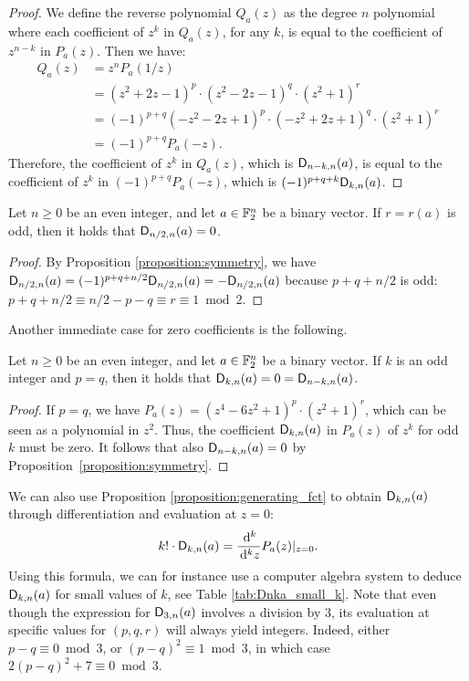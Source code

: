 \documentclass{llncs}
\begin{document}
\begin{proof}
	We define the reverse polynomial  $Q_a(z)$ as the degree $n$ polynomial where each coefficient of $z^k$ in $Q_a(z)$, for any $k$, is equal to the coefficient of $z^{n-k}$ in $P_a(z)$. 
	Then we have:
	\begin{align*}
		Q_a(z)&=z^nP_a(1/z)\\
		&=(z^2+2z-1)^p\cdot(z^2-2z-1)^q\cdot(z^2+1)^r\\
		&=(-1)^{p+q}(-z^2-2z+1)^p\cdot(-z^2+2z+1)^q\cdot(z^2+1)^r\\
		&=(-1)^{p+q}P_a(-z).
	\end{align*}
	Therefore, the coefficient of $z^k$ in $Q_a(z)$, which is $\Dnka n{n-k}a$, is equal to the coefficient of $z^k$ in $(-1)^{p+q}P_a(-z)$, which is $(-1)^{p+q+k}\Dnka nka$.
\end{proof}

\begin{Corollary}
    Let $n\geq 0$ be an even integer, and let $a\in\F_2^n$ be a binary vector. If $r=r(a)$ is odd, then it holds that $\Dnka n{n/2}a=0$.
\end{Corollary}

\begin{proof}
	By Proposition \ref{proposition:symmetry}, we have $\Dnka n{n/2}a=(-1)^{p+q+n/2}\Dnka n{n/2}a=-\Dnka n{n/2}a$ because $p+q+n/2$ is odd: $p+q+n/2\equiv n/2-p-q\equiv r\equiv 1\bmod 2$.
\end{proof}

Another immediate case for zero coefficients is the following.

\begin{proposition}
    Let $n\geq 0$ be an even integer, and let $a\in\F_2^n$ be a binary vector. If $k$ is an odd integer and  $p=q$, then it holds that $\Dnka nka=0=\Dnka n{n-k}a$.
\end{proposition}

\begin{proof}
    If $p=q$, we have $P_a(z)=(z^4-6z^2+1)^p\cdot(z^2+1)^r$, which can be seen as a polynomial in $z^2$. Thus, the coefficient $\Dnka nka$ in $P_a(z)$ of $z^k$ for odd $k$ must be zero. It follows that also $\Dnka n{n-k}a=0$ by Proposition~\ref{proposition:symmetry}.
\end{proof}

\begin{remark}\label{remark:D_nka_differentiation}
    We can also use Proposition \ref{proposition:generating_fct} to obtain $\Dnka nka$ through differentiation and evaluation at $z=0$:
    \[
        k!\cdot\Dnka nka=\frac{\dd^k}{\dd^k z}P_a(z)\vert_{z=0}.
    \]
    Using this formula, we can for instance use a computer algebra system to deduce $\Dnka nka$ for small values of $k$, see Table \ref{tab:Dnka_small_k}. Note that even though the expression for $\Dnka n3a$ involves a division by $3$, its evaluation at specific values for $(p,q,r)$ will always yield integers. Indeed, either $p-q\equiv 0\bmod 3$, or $(p-q)^2\equiv 1\bmod 3$, in which case $2(p-q)^2+7\equiv 0\bmod 3$.
\end{remark}
\end{document}
